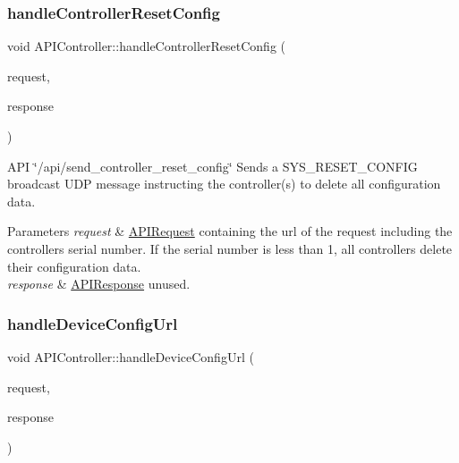 \subsubsection{\texorpdfstring{handle\+Controller\+Reset\+Config}{handleControllerResetConfig}}
{\footnotesize\ttfamily void A\+P\+I\+Controller\+::handle\+Controller\+Reset\+Config (\begin{DoxyParamCaption}\item[{const \hyperlink{class_a_p_i_request}{A\+P\+I\+Request} \&}]{request,  }\item[{\hyperlink{class_a_p_i_response}{A\+P\+I\+Response} $\ast$}]{response }\end{DoxyParamCaption})\hspace{0.3cm}{\ttfamily [slot]}}

A\+PI \char`\"{}/api/send\+\_\+controller\+\_\+reset\+\_\+config\char`\"{} Sends a S\+Y\+S\+\_\+\+R\+E\+S\+E\+T\+\_\+\+C\+O\+N\+F\+IG broadcast U\+DP message instructing the controller(s) to delete all configuration data. 
\begin{DoxyParams}{Parameters}
{\em request} & \hyperlink{class_a_p_i_request}{A\+P\+I\+Request} containing the url of the request including the controller\textquotesingle{}s serial number. If the serial number is less than 1, all controllers delete their configuration data. \\
\hline
{\em response} & \hyperlink{class_a_p_i_response}{A\+P\+I\+Response} unused. \\
\hline
\end{DoxyParams}
\mbox{\label{class_a_p_i_controller_a3d32a4cf1f6a06697b09d43a2be140cf}} 
\subsubsection{\texorpdfstring{handle\+Device\+Config\+Url}{handleDeviceConfigUrl}}
{\footnotesize\ttfamily void A\+P\+I\+Controller\+::handle\+Device\+Config\+Url (\begin{DoxyParamCaption}\item[{const \hyperlink{class_a_p_i_request}{A\+P\+I\+Request} \&}]{request,  }\item[{\hyperlink{class_a_p_i_response}{A\+P\+I\+Response} $\ast$}]{response }\end{DoxyParamCaption})\hspace{0.3cm}{\ttfamily [slot]}}

